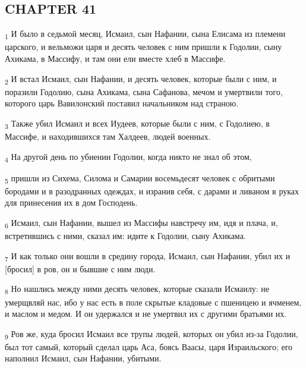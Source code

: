 \subsection{CHAPTER 41}
\begin{tcolorbox}
\textsubscript{1} И было в седьмой месяц, Исмаил, сын Нафании, сына Елисама из племени царского, и вельможи царя и десять человек с ним пришли к Годолии, сыну Ахикама, в Массифу, и там они ели вместе хлеб в Массифе.
\end{tcolorbox}
\begin{tcolorbox}
\textsubscript{2} И встал Исмаил, сын Нафании, и десять человек, которые были с ним, и поразили Годолию, сына Ахикама, сына Сафанова, мечом и умертвили того, которого царь Вавилонский поставил начальником над страною.
\end{tcolorbox}
\begin{tcolorbox}
\textsubscript{3} Также убил Исмаил и всех Иудеев, которые были с ним, с Годолиею, в Массифе, и находившихся там Халдеев, людей военных.
\end{tcolorbox}
\begin{tcolorbox}
\textsubscript{4} На другой день по убиении Годолии, когда никто не знал об этом,
\end{tcolorbox}
\begin{tcolorbox}
\textsubscript{5} пришли из Сихема, Силома и Самарии восемьдесят человек с обритыми бородами и в разодранных одеждах, и изранив себя, с дарами и ливаном в руках для принесения их в дом Господень.
\end{tcolorbox}
\begin{tcolorbox}
\textsubscript{6} Исмаил, сын Нафании, вышел из Массифы навстречу им, идя и плача, и, встретившись с ними, сказал им: идите к Годолии, сыну Ахикама.
\end{tcolorbox}
\begin{tcolorbox}
\textsubscript{7} И как только они вошли в средину города, Исмаил, сын Нафании, убил их и [бросил] в ров, он и бывшие с ним люди.
\end{tcolorbox}
\begin{tcolorbox}
\textsubscript{8} Но нашлись между ними десять человек, которые сказали Исмаилу: не умерщвляй нас, ибо у нас есть в поле скрытые кладовые с пшеницею и ячменем, и маслом и медом. И он удержался и не умертвил их с другими братьями их.
\end{tcolorbox}
\begin{tcolorbox}
\textsubscript{9} Ров же, куда бросил Исмаил все трупы людей, которых он убил из-за Годолии, был тот самый, который сделал царь Аса, боясь Ваасы, царя Израильского; его наполнил Исмаил, сын Нафании, убитыми.
\end{tcolorbox}
